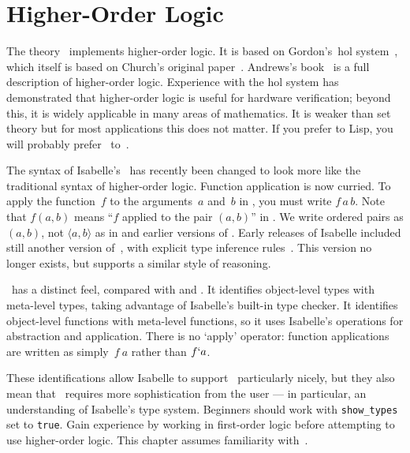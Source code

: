 \chapter{Higher-Order Logic}

The theory~ implements higher-order logic.  It is based on
Gordon's~{\sc hol} system~\cite{mgordon-hol}, which itself is based on
Church's original paper~\cite{church40}.  Andrews's book~\cite{andrews86} is a
full description of higher-order logic.  Experience with the {\sc hol} system
has demonstrated that higher-order logic is useful for hardware verification;
beyond this, it is widely applicable in many areas of mathematics.  It is
weaker than {\ZF} set theory but for most applications this does not matter.
If you prefer {\ML} to Lisp, you will probably prefer \HOL\ to~{\ZF}.

The syntax of Isabelle's \HOL\ has recently been changed to look more like the
traditional syntax of higher-order logic.  Function application is now
curried.  To apply the function~$f$ to the arguments~$a$ and~$b$ in \HOL, you
must write $f\,a\,b$.  Note that $f(a,b)$ means ``$f$ applied to the pair
$(a,b)$'' in \HOL.  We write ordered pairs as $(a,b)$, not $\langle
a,b\rangle$ as in {\ZF} and earlier versions of \HOL.  Early releases of
Isabelle included still another version of~\HOL, with explicit type inference
rules~\cite{paulson-COLOG}.  This version no longer exists, but 
supports a similar style of reasoning.

\HOL\ has a distinct feel, compared with {\ZF} and {\CTT}.  It
identifies object-level types with meta-level types, taking advantage of
Isabelle's built-in type checker.  It identifies object-level functions
with meta-level functions, so it uses Isabelle's operations for abstraction
and application.  There is no `apply' operator: function applications are
written as simply~$f~a$ rather than $f{\tt`}a$.

These identifications allow Isabelle to support \HOL\ particularly nicely,
but they also mean that \HOL\ requires more sophistication from the user
--- in particular, an understanding of Isabelle's type system.  Beginners
should work with {\tt show_types} set to {\tt true}.  Gain experience by
working in first-order logic before attempting to use higher-order logic.
This chapter assumes familiarity with~{\FOL{}}.



